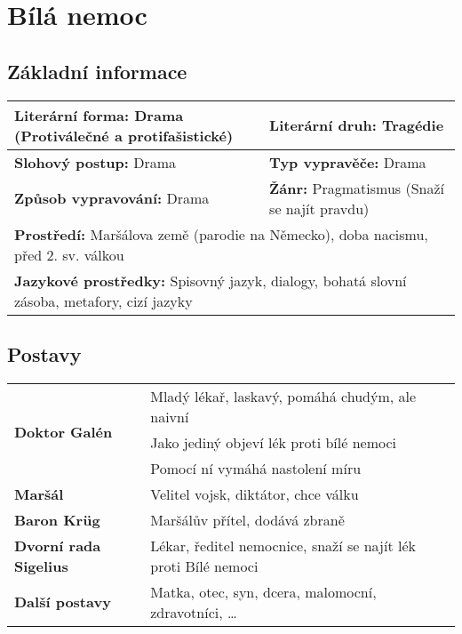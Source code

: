 \section{Bílá nemoc}
\label{sec:bilanemoc}
\subsection*{Základní informace}
\begin{tabularx}{\linewidth}{l|l}
  \textbf{Literární forma:} Drama (Protiválečné a protifašistické) & \textbf{Literární druh:} Tragédie                   \\
  \hline
  \textbf{Slohový postup:} Drama                                   & \textbf{Typ vypravěče:} Drama                       \\
  \hline
  \textbf{Způsob vypravování:} Drama                               & \textbf{Žánr:} Pragmatismus (Snaží se najít pravdu) \\
  \hline
  \multicolumn{2}{l}{\textbf{Prostředí:} Maršálova země (parodie na Německo), doba nacismu, před 2. sv. válkou}          \\
  \hline
  \multicolumn{2}{l}{\textbf{Jazykové prostředky:} Spisovný jazyk, dialogy, bohatá slovní zásoba, metafory, cizí jazyky} \\
\end{tabularx}
\subsection*{Postavy}
\begin{tabularx}{\linewidth}{l|l}
  \multirow{3}{15em}{\textbf{Doktor Galén}} & Mladý lékař, laskavý, pomáhá chudým, ale naivní                \\
                                            & Jako jediný objeví lék proti bílé nemoci                       \\
                                            & Pomocí ní vymáhá nastolení míru                                \\
  \hline
  \textbf{Maršál}                           & Velitel vojsk, diktátor, chce válku                            \\
  \hline
  \textbf{Baron Krüg}                       & Maršálův přítel, dodává zbraně                                 \\
  \hline
  \textbf{Dvorní rada Sigelius}             & Lékar, ředitel nemocnice, snaží se najít lék proti Bílé nemoci \\
  \hline
  \textbf{Další postavy}                    & Matka, otec, syn, dcera, malomocní, zdravotníci, \dots         \\
\end{tabularx}
